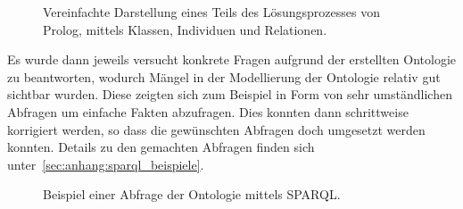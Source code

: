 \begin{figure}[H]
\centering {}
\caption{Vereinfachte Darstellung eines Teils des Lösungsprozesses von Prolog, mittels Klassen, Individuen und Relationen.\label{fig:prolog_loesungsprozess}\protect\footnotemark}
\end{figure}

Es wurde dann jeweils versucht konkrete Fragen aufgrund der erstellten Ontologie zu beantworten, wodurch Mängel in der Modellierung der Ontologie relativ gut sichtbar wurden. Diese zeigten sich zum Beispiel in Form von sehr umständlichen Abfragen um einfache Fakten abzufragen. Dies konnten dann schrittweise korrigiert werden, so dass die gewünschten Abfragen doch umgesetzt werden konnten. Details zu den gemachten Abfragen finden sich unter~\autoref{sec:anhang:sparql_beispiele}.

\begin{figure}[H]
\centering {}
\caption{Beispiel einer Abfrage der Ontologie mittels SPARQL.\label{fig:sparql_beispiel}\protect\footnotemark}
\end{figure}


